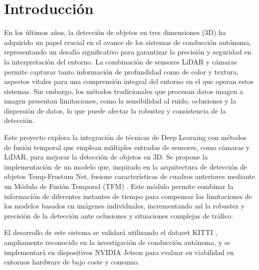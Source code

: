 

\section{Introducción}
\label{sec:introduccion}

En los últimos años, la detección de objetos en tres dimensiones (3D) ha adquirido un papel crucial en el avance de los sistemas de conducción autónoma, representando un desafío significativo para garantizar la precisión y seguridad en la interpretación del entorno. La combinación de sensores LiDAR y cámaras permite capturar tanto información de profundidad como de color y textura, aspectos vitales para una comprensión integral del entorno en el que operan estos sistemas. Sin embargo, los métodos tradicionales que procesan datos imagen a imagen presentan limitaciones, como la sensibilidad al ruido, oclusiones y la dispersión de datos, lo que puede afectar la robustez y consistencia de la detección.

Este proyecto explora la integración de técnicas de Deep Learning con métodos de fusión temporal que emplean múltiples entradas de sensores, como cámaras y LiDAR, para mejorar la detección de objetos en 3D. Se propone la implementación de un modelo que, inspirado en la arquitectura de detección de objetos Temp-Frustum Net, fusione características de cuadros anteriores mediante un Módulo de Fusión Temporal (TFM) \cite{frustum}. Este módulo permite combinar la información de diferentes instantes de tiempo para compensar las limitaciones de los modelos basados en imágenes individuales, incrementando así la robustez y precisión de la detección ante oclusiones y situaciones complejas de tráfico.

El desarrollo de este sistema se validará utilizando el dataset KITTI \cite{kitti}, ampliamente reconocido en la investigación de conducción autónoma, y se implementará en dispositivos NVIDIA Jetson para evaluar su viabilidad en entornos hardware de bajo coste y consumo.

